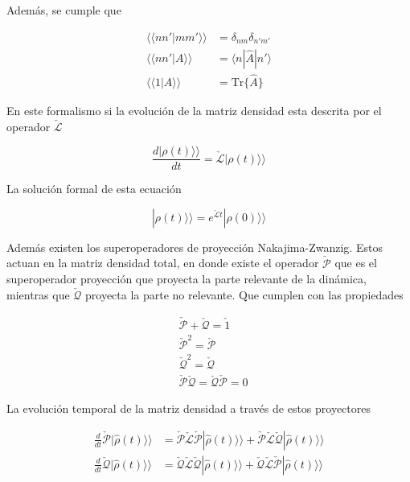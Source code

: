 Además, se cumple que 

\begin{align*}
    \langle \langle nn'|mm'\rangle \rangle & = \delta_{nm}\delta_{n'm'}\\
    \langle \langle nn'|A\rangle \rangle & = \langle n|\hat{A}|n'\rangle \\
    \langle \langle 1|A\rangle \rangle & = \text{Tr}\{\hat{A}\} 
\end{align*}

En este formalismo si la evolución de la matriz densidad esta descrita por el operador $\check{\mathcal{L}}$

\begin{equation*}
    \frac{d|\rho(t) \rangle \rangle}{dt} = \check{\mathcal{L}}|\rho(t) \rangle \rangle
\end{equation*}

La solución formal de esta ecuación

\begin{equation}
    |\rho(t)\rangle \rangle = e^{\check{\mathcal{L}}t}|\rho(0)\rangle \rangle 
    \label{sec2liouvilleformal}
\end{equation}

Además existen los superoperadores de proyección Nakajima-Zwanzig\cite{zwanzig1966statistical}. Estos actuan en la matriz densidad total, en donde existe el operador  $\check{\mathcal{P}}$ que es el superoperador proyección que proyecta la parte relevante de la dinámica, mientras que $\check{\mathcal{Q}}$ proyecta la parte no relevante. Que cumplen con las propiedades

\begin{align*}
    & \check{\mathcal{P}} + \check{\mathcal{Q}} = \check{1} \\
    & \check{\mathcal{P}}^{2} = \check{\mathcal{P}} \\
    & \check{\mathcal{Q}}^{2} = \check{\mathcal{Q}} \\
    & \check{\mathcal{P}}\check{\mathcal{Q}} = \check{\mathcal{Q}}\check{\mathcal{P}} = 0 
\end{align*}    

La evolución temporal de la matriz densidad a través de estos proyectores

\begin{align*}
    \frac{d}{dt}\check{\mathcal{P}}|\hat{\rho}(t)\rangle \rangle & = \check{\mathcal{P}}\check{\mathcal{L}}\check{\mathcal{P}}|\hat{\rho}(t)\rangle \rangle  + \check{\mathcal{P}}\check{\mathcal{L}}\check{\mathcal{Q}}|\hat{\rho}(t)\rangle \rangle \\
    \frac{d}{dt}\check{\mathcal{Q}}|\hat{\rho}(t)\rangle \rangle  & = \check{\mathcal{Q}}\check{\mathcal{L}}\check{\mathcal{Q}}|\hat{\rho}(t)\rangle \rangle  + \check{\mathcal{Q}}\check{\mathcal{L}}\check{\mathcal{P}}|\hat{\rho}(t)\rangle \rangle 
\end{align*}

